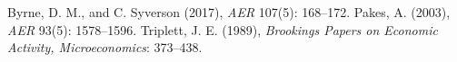 ﻿\documentclass[12pt]{article}
\numberwithin{equation}{section}
\begin{document}
\begin{thebibliography}{}
 Byrne, D. M., and C. Syverson (2017), \emph{AER} 107(5): 168--172.
 Pakes, A. (2003), \emph{AER} 93(5): 1578--1596.
 Triplett, J. E. (1989), \emph{Brookings Papers on Economic Activity, Microeconomics}: 373--438.
\end{thebibliography}
\end{document}
